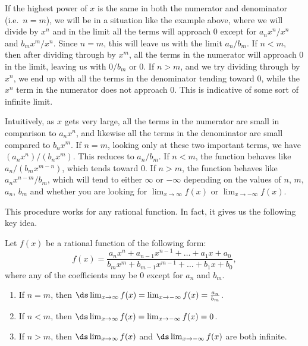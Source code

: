 If the highest power of $x$ is the same in both the numerator and denominator (i.e.\ $n=m$), we will be in a situation like the example above, where we will divide by $x^n$ and in the limit all the terms will approach 0 except for $a_nx^n/x^n$ and $b_mx^m/x^n$. Since $n=m$, this will leave us with the limit $a_n/b_m$.  If $n<m$, then after dividing through by $x^m$, all the terms in the numerator will approach 0 in the limit, leaving us with $0/b_m$ or 0.  If $n>m$, and we try dividing through by $x^n$, we end up with all the terms in the denominator tending toward 0, while the $x^n$ term in the numerator does not approach 0.  This is indicative of some sort of infinite limit.

Intuitively, as $x$ gets very large, all the terms in the numerator are small in comparison to $a_nx^n$, and likewise all the terms in the denominator are small compared to $b_nx^m$.  If $n=m$, looking only at these two important terms, we have $(a_nx^n)/(b_nx^m)$.  This reduces to $a_n/b_m$.  If $n<m$, the function behaves like $a_n/(b_mx^{m-n})$, which tends toward 0.  If $n>m$, the function behaves like $a_nx^{n-m}/b_m$, which will tend to either $\infty$ or $-\infty$ depending on the values of $n$, $m$, $a_n$, $b_m$ and whether you are looking for $\lim_{x\rightarrow\infty} f(x)$ or $\lim_{x\rightarrow-\infty} f(x)$.

This procedure works for any rational function.  In fact, it gives us the following key idea.

\begin{keyidea}\label{thm:lim_rational_fn_at_infty}%
Let $f(x)$ be a rational function of the following form:
\[f(x)=\frac{a_nx^n + a_{n-1}x^{n-1}+\dots + a_1x + a_0}{b_mx^m + b_{m-1}x^{m-1} + \dots + b_1x + b_0},\]
where any of the coefficients may be 0 except for $a_n$ and $b_m$.
\begin{enumerate}
\item If $n=m$, then $\ds\lim_{x\rightarrow\infty} f(x) = \lim_{x\rightarrow-\infty} f(x) = \frac{a_n}{b_m}$.
\item If $n<m$, then $\ds\lim_{x\rightarrow\infty} f(x) = \lim_{x\rightarrow-\infty} f(x) = 0$.
\item If $n>m$, then $\ds\lim_{x\rightarrow\infty} f(x)$ and $\ds\lim_{x\to-\infty} f(x)$ are both infinite.
\end{enumerate}
\end{keyidea}


